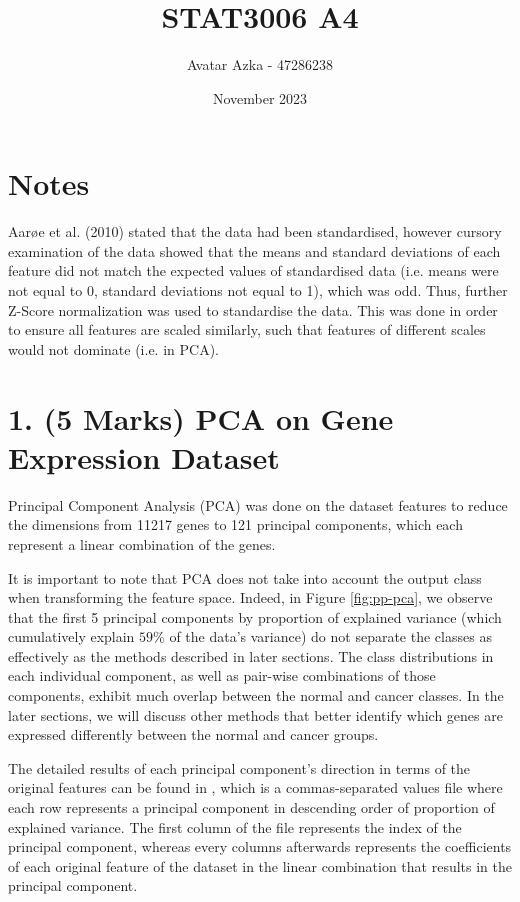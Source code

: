 \documentclass[twocolumn]{article}
\title{STAT3006 A4}
\author{Avatar Azka - 47286238}
\date{November 2023}
\begin{document}
\onecolumn
\maketitle
{
    \hypersetup{linkcolor=black}
    \tableofcontents
    \newpage
    \listoffigures
    \listoftables
}

\newpage
\twocolumn
\section{Notes}

Aarøe et al. (2010) \cite{Aarøe2010} stated that the data had been standardised, however cursory examination of the data showed that the means and standard deviations of each feature did not match the expected values of standardised data (i.e. means were not equal to 0, standard deviations not equal to 1), which was odd. Thus, further Z-Score normalization was used to standardise the data. This was done in order to ensure all features are scaled similarly, such that features of different scales would not dominate (i.e. in PCA). 

\section{1. (5 Marks) PCA on Gene Expression Dataset}
Principal Component Analysis (PCA) was done on the dataset features to reduce the dimensions from 11217 genes to 121 principal components, which each represent a linear combination of the genes.

It is important to note that PCA does not take into account the output class when transforming the feature space. Indeed, in Figure \ref{fig:pp-pca}, we observe that the first 5 principal components by proportion of explained variance (which cumulatively explain $59\%$ of the data's variance) do not separate the classes as effectively as the methods described in later sections. The class distributions in each individual component, as well as pair-wise combinations of those components, exhibit much overlap between the normal and cancer classes. In the later sections, we will discuss other methods that better identify which genes are expressed differently between the normal and cancer groups.

The detailed results of each principal component's direction in terms of the original features can be found in , which is a commas-separated values file where each row represents a principal component in descending order of proportion of explained variance. The first column of the file represents the index of the principal component, whereas every columns afterwards represents the coefficients of each original feature of the dataset in the linear combination that results in the principal component.
\end{document}
